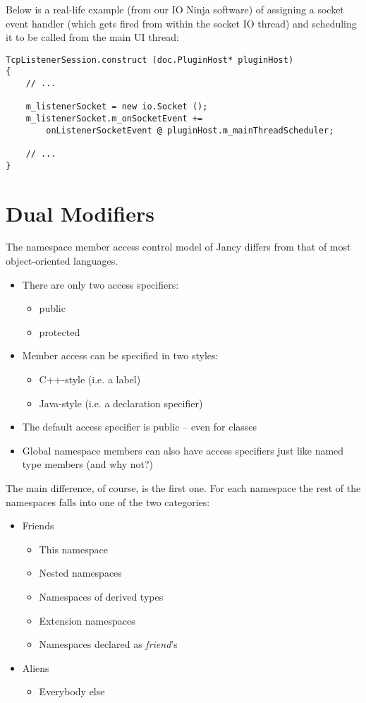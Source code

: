 \documentclass[oneside]{book}
\begin{document}
Below is a real-life example (from our IO Ninja software) of assigning a socket event handler (which gets fired from within the socket IO thread) and scheduling it to be called from the main UI thread:

\begin{lstlisting}
TcpListenerSession.construct (doc.PluginHost* pluginHost)
{
    // ...

    m_listenerSocket = new io.Socket ();
    m_listenerSocket.m_onSocketEvent += 
        onListenerSocketEvent @ pluginHost.m_mainThreadScheduler;

    // ...
}
\end{lstlisting}

\section{Dual Modifiers}

The namespace member access control model of Jancy differs from that of most object-oriented languages.

\begin{itemize}
\item There are only two access specifiers:
	\begin{itemize}
	\item public
	\item protected
	\end{itemize}
\item Member access can be specified in two styles:
	\begin{itemize}
	\item C++-style (i.e. a label)
	\item Java-style (i.e. a declaration specifier)
	\end{itemize}
\item The default access specifier is public -- even for classes
\item Global namespace members can also have access specifiers just like named type members (and why not?)
\end{itemize}

The main difference, of course, is the first one. For each namespace the rest of the namespaces falls into one of the two categories:
\begin{itemize}
\item Friends
	\begin{itemize}
	\item This namespace
	\item Nested namespaces
	\item Namespaces of derived types
	\item Extension namespaces
	\item Namespaces declared as \emph{friend}'s
	\end{itemize}
\item Aliens
	\begin{itemize}
	\item Everybody else
	\end{itemize}
\end{itemize}
\end{document}
